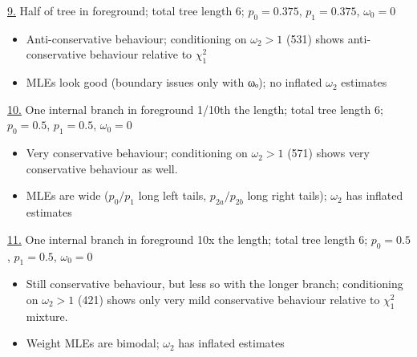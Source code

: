 \documentclass[11pt]{article}
\begin{document}
\href{https://ftfl.ca/misc/bsa/bsa\_sim9\_8-taxon-tree.pdf}{9.} Half of tree in foreground; total tree length 6; \(p_0=0.375\),
\(p_1=0.375\), \(\omega_0=0\)
\begin{itemize}
\item Anti-conservative behaviour; conditioning on \(\omega_2>1\) (531) shows
anti-conservative behaviour relative to \(\chi^2_1\)
\item MLEs look good (boundary issues only with ωₒ); no inflated \(\omega_2\)
estimates
\end{itemize}

\href{https://ftfl.ca/misc/bsa/zbsa\_sim10\_8-taxon-tree.pdf}{10.} One internal branch in foreground 1/10th the length; total tree length
6; \(p_0=0.5\), \(p_1=0.5\), \(\omega_0=0\)
\begin{itemize}
\item Very conservative behaviour; conditioning on \(\omega_2>1\) (571) shows very
conservative behaviour as well.
\item MLEs are wide (\(p_0/p_1\) long left tails, \(p_{2a}/p_{2b}\) long right
tails); \(\omega_2\) has inflated estimates
\end{itemize}

\href{https://ftfl.ca/misc/bsa/zbsa\_sim11\_8-taxon-tree.pdf}{11.} One internal branch in foreground 10x the length; total tree length 6;
\(p_0=0.5\), \(p_1=0.5\), \(\omega_0=0\)
\begin{itemize}
\item Still conservative behaviour, but less so with the longer branch;
conditioning on \(\omega_2>1\) (421) shows only very mild conservative
behaviour relative to \(\chi^2_1\) mixture.
\item Weight MLEs are bimodal; \(\omega_2\) has inflated estimates
\end{itemize}
\end{document}
